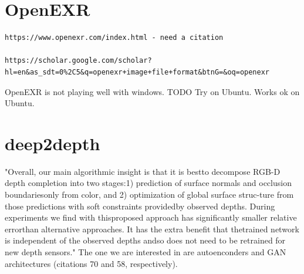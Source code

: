 \section{OpenEXR}
\begin{verbatim}
https://www.openexr.com/index.html - need a citation

https://scholar.google.com/scholar?hl=en&as_sdt=0%2C5&q=openexr+image+file+format&btnG=&oq=openexr
\end{verbatim}

OpenEXR is not playing well with windows. TODO Try on Ubuntu. Works ok on Ubuntu.

\section{deep2depth}
"Overall,  our  main  algorithmic  insight  is  that  it  is  bestto  decompose  RGB-D  depth  completion  into  two  stages:1) prediction of surface normals and occlusion boundariesonly from color, and 2) optimization of global surface struc-ture from those predictions with soft constraints providedby observed depths.  During experiments we find with thisproposed  approach  has  significantly  smaller  relative  errorthan alternative approaches. It has the extra benefit that thetrained network is independent of the observed depths andso does not need to be retrained for new depth sensors."  
The one we are interested in are autoenconders and GAN architectures (citations 70 and 58, respectively).

